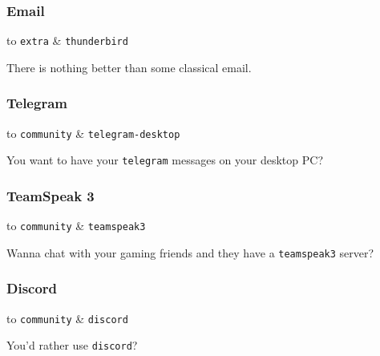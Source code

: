 \documentclass[9pt]{report}
\newenvironment{packagetable}
{\begin{longtabu}to \textwidth [b]{X[1,r]|X[1,l]}}
{\end{longtabu}}
\begin{document}
\newpage

\hypertarget{x-email}{\subsubsection{Email}}
\begin{packagetable}
    \texttt{extra} & \texttt{thunderbird} \\ 
\end{packagetable}

There is nothing better than some classical email.



\newpage

\hypertarget{x-telegram}{\subsubsection{Telegram}}
\begin{packagetable}
    \texttt{community} & \texttt{telegram-desktop} \\ 
\end{packagetable}

You want to have your \texttt{telegram} messages on your desktop PC?



\newpage

\hypertarget{x-teamspeak-3}{\subsubsection{TeamSpeak 3}}
\begin{packagetable}
    \texttt{community} & \texttt{teamspeak3} \\ 
\end{packagetable}

Wanna chat with your gaming friends and they have a \texttt{teamspeak3} server?



\newpage

\hypertarget{x-discord}{\subsubsection{Discord}}
\begin{packagetable}
    \texttt{community} & \texttt{discord} \\ 
\end{packagetable}

You’d rather use \texttt{discord}?
\end{document}
